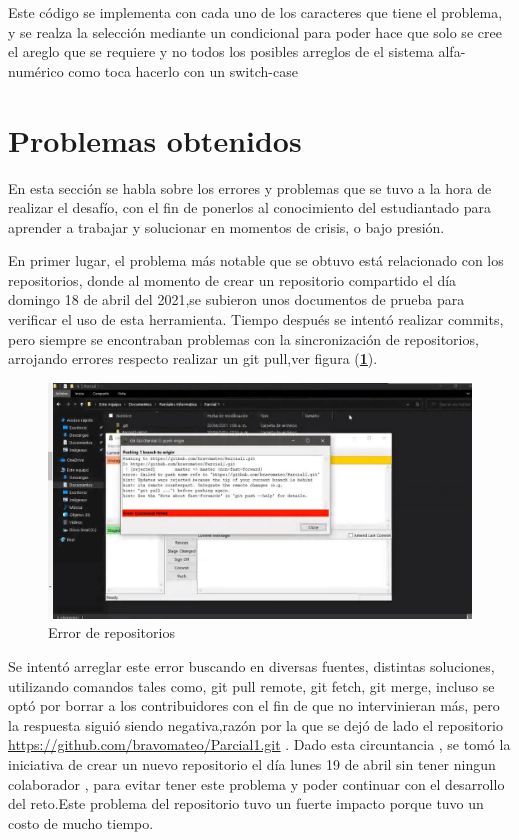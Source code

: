 \documentclass{article}
\begin{document}
Este código se implementa con cada uno de los caracteres que tiene el problema, y se realza la selección mediante un condicional para poder hace que solo se cree el areglo que se requiere y no todos los posibles arreglos de el sistema alfa-numérico como toca hacerlo con un switch-case

\section{Problemas obtenidos}\label{problem}
En esta sección se habla sobre los errores y problemas que se tuvo a la hora de realizar el desafío, con el fin de ponerlos al conocimiento del estudiantado para aprender a trabajar y solucionar en momentos de crisis, o bajo presión.

En primer lugar, el problema más notable que se obtuvo está relacionado con los repositorios, donde al momento de crear un repositorio compartido el día domingo 18 de abril del 2021,se subieron unos documentos de prueba para verificar el uso de esta herramienta. Tiempo después se intentó  realizar commits, pero siempre se encontraban problemas con la sincronización de repositorios, arrojando errores respecto realizar un git pull,ver figura (\textbf{\ref{repoerror}}).

    \begin{figure}[h]
    \includegraphics[width=15cm]{Error1.jpeg}
    \centering
    \caption{Error de repositorios}
    \label{repoerror}
    \end{figure}
    
Se intentó arreglar este error buscando en diversas fuentes, distintas soluciones, utilizando comandos tales como, git pull remote, git fetch, git merge, incluso se optó por borrar a los contribuidores con el fin de que no intervinieran más, pero la respuesta siguió siendo negativa,razón por la que se dejó de lado el repositorio\\ \url{https://github.com/bravomateo/Parcial1.git} . Dado esta circuntancia , se tomó la iniciativa de crear un nuevo repositorio el día lunes 19 de abril sin tener ningun colaborador , para evitar tener este problema y poder continuar con el desarrollo del reto.Este problema del repositorio tuvo un fuerte impacto porque tuvo un costo de mucho tiempo.\\
\end{document}
